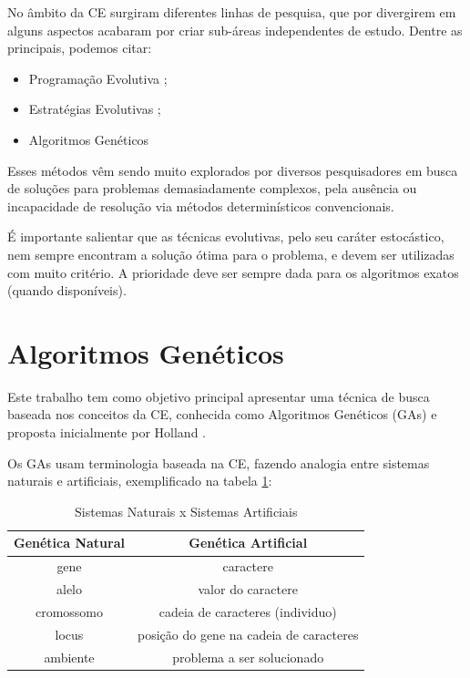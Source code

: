 No âmbito da CE surgiram diferentes linhas de pesquisa, que por divergirem em alguns aspectos acabaram por criar sub-áreas independentes de estudo. Dentre as principais, podemos citar:
\begin{itemize}
 \item Programação Evolutiva \cite{Fogel}; 
 \item Estratégias Evolutivas \cite{Rechenberg};
 \item Algoritmos Genéticos \cite{Holland}
\end{itemize} 

Esses métodos vêm sendo muito explorados por diversos pesquisadores em busca de soluções para problemas demasiadamente complexos, pela ausência ou incapacidade de resolução via métodos determinísticos convencionais.

É importante salientar que as técnicas evolutivas, pelo seu caráter estocástico, nem sempre encontram a solução ótima para o problema, e devem ser utilizadas com muito critério. A prioridade deve ser sempre dada para os algoritmos exatos (quando disponíveis).

\section{Algoritmos Genéticos}

Este trabalho tem como objetivo principal apresentar uma técnica de busca baseada nos conceitos da CE, conhecida como Algoritmos Genéticos (GAs) e proposta inicialmente por Holland \cite{Holland}.

Os GAs usam terminologia baseada na CE, fazendo analogia entre sistemas naturais e artificiais, exemplificado na tabela \ref{tabSist}:

\begin{table}[htp]
 \caption{\label{tabSist}Sistemas Naturais x Sistemas Artificiais}
 \begin{center}
  \begin{tabular}{c|c}
   \hline
   \textbf{Genética Natural}  & \textbf{Genética Artificial} \\
   \hline
   gene    & caractere \\
   alelo    & valor do caractere \\
   cromossomo & cadeia de caracteres (individuo) \\ 
   locus    & posição do gene na cadeia de caracteres \\
   ambiente  & problema a ser solucionado \\
   \hline
   \end{tabular}
 \end{center}
\end{table}
 
